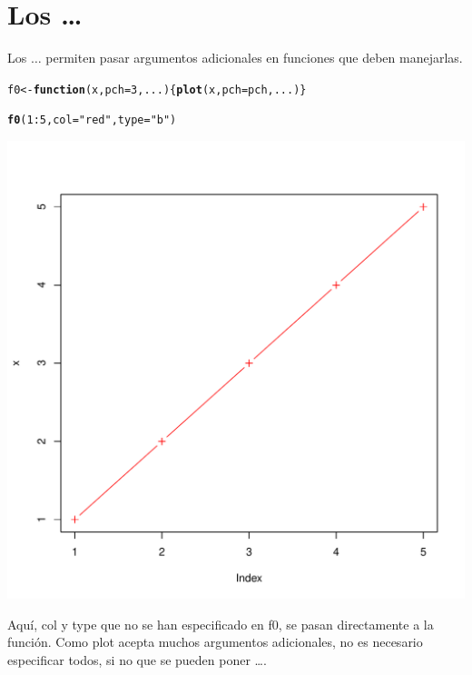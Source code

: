 \documentclass{config/apuntes}\usepackage[]{graphicx}\usepackage[]{xcolor}
\makeatletter
\def\maxwidth{ %
  \ifdim\Gin@nat@width>\linewidth
    \linewidth
  \else
    \Gin@nat@width
  \fi
}
\newcommand{\hlnum}[1]{\textcolor[rgb]{0.686,0.059,0.569}{#1}}%
\newcommand{\hlsng}[1]{\textcolor[rgb]{0.192,0.494,0.8}{#1}}%
\newcommand{\hlopt}[1]{\textcolor[rgb]{0,0,0}{#1}}%
\newcommand{\hldef}[1]{\textcolor[rgb]{0.345,0.345,0.345}{#1}}%
\newcommand{\hlkwa}[1]{\textcolor[rgb]{0.161,0.373,0.58}{\textbf{#1}}}%
\newcommand{\hlkwb}[1]{\textcolor[rgb]{0.69,0.353,0.396}{#1}}%
\newcommand{\hlkwc}[1]{\textcolor[rgb]{0.333,0.667,0.333}{#1}}%
\newcommand{\hlkwd}[1]{\textcolor[rgb]{0.737,0.353,0.396}{\textbf{#1}}}%
\newenvironment{kframe}{%
 \def\at@end@of@kframe{}%
 \ifinner\ifhmode%
  \def\at@end@of@kframe{\end{minipage}}%
  \begin{minipage}{\columnwidth}%
 \fi\fi%
 \def\FrameCommand##1{\hskip\@totalleftmargin \hskip-\fboxsep
 \colorbox{shadecolor}{##1}\hskip-\fboxsep
     \hskip-\linewidth \hskip-\@totalleftmargin \hskip\columnwidth}%
 \MakeFramed {\advance\hsize-\width
   \@totalleftmargin\z@ \linewidth\hsize
   \@setminipage}}%
 {\par\unskip\endMakeFramed%
 \at@end@of@kframe}
\newenvironment{knitrout}{}{} %
\makeatother
\begin{document}
\section{Los \ldots}
Los $\ldots$ permiten pasar argumentos adicionales en funciones que deben manejarlas.

\begin{knitrout}
\color{fgcolor}\begin{kframe}
\begin{alltt}
\hldef{f0} \hlkwb{<-} \hlkwa{function}\hldef{(}\hlkwc{x}\hldef{,} \hlkwc{pch} \hldef{=} \hlnum{3}\hldef{,} \hlkwc{...}\hldef{) \{}\hlkwd{plot}\hldef{(x,} \hlkwc{pch} \hldef{= pch, ...)\}}

\hlkwd{f0}\hldef{(}\hlnum{1}\hlopt{:}\hlnum{5}\hldef{,} \hlkwc{col} \hldef{=} \hlsng{"red"}\hldef{,} \hlkwc{type} \hldef{=} \hlsng{"b"}\hldef{)}
\end{alltt}
\end{kframe}
\includegraphics[width=\maxwidth]{figure/unnamed-chunk-101-1} 
\end{knitrout}

Aquí, col y type que no se han especificado en f0, se pasan directamente a la función. Como plot acepta muchos argumentos adicionales, no es necesario especificar todos, si no que se pueden poner \ldots.
\end{document}
